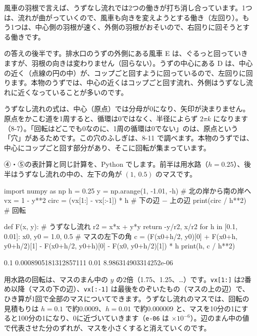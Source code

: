 \noindent 風車の羽根で言えば、うずなし流れでは2つの働きが打ち消し合っています。1つは、流れが曲がっていくので、風車も向きを変えようとする働き（左回り）。もう1つは、中心側の羽根が速く、外側の羽根がおそいので、右回りに回そうとする働きです。

\noindent \bkhatenaref の答えの後半です。排水口のうずの外側にある風車 E は、ぐるっと回っていきますが、羽根の向きは変わりません（回らない）。うずの中心にある D は、中心の近く（点線の円の中）が、コップごと回すように回っているので、左回りに回ります。本物のうずでは、中心の近くはコップごと回す流れ、外側はうずなし流れに近くなっていることが多いのです。

\begin{seikaku}
うずなし流れの式は、中心（原点）では分母が0になり、矢印が決まりません。原点をかこむ道を1周すると、循環は0ではなく、半径によらず $2\pi k$ になります（8-7）。「回転はどこでも0なのに、1周の循環は0でない」のは、原点という「穴」があるためです。この穴のふしぎは、8-11 で調べます。本物のうずでは、中心にコップごと回す部分があり、そこに回転が集まっています。
\end{seikaku}

④・⑤の表計算と同じ計算を、Python でします。前半は用水路（$h=0.25$）、後半はうずなし流れの中の、左下の角が $(1,\ 0.5)$ のマスです。
\begin{bkcode}[Python]
import numpy as np
h = 0.25
y = np.arange(1, -1.01, -h)      \# 北の岸から南の岸へ
vx = 1 - y**2
circ = (vx[1:] - vx[:-1]) * h    \# 下の辺 − 上の辺
print(circ / h**2)               \# 回転

def F(x, y):                     \# うずなし流れ
    r2 = x*x + y*y
    return -y/r2, x/r2
for h in [0.1, 0.01]:
    x0, y0 = 1.0, 0.5            \# マスの左下の角
    c = (F(x0+h/2, y0)[0] + F(x0+h, y0+h/2)[1]
         - F(x0+h/2, y0+h)[0] - F(x0, y0+h/2)[1]) * h
    print(h, c / h**2)
\end{bkcode}
\begin{bkcodeout}[実行結果]
[ 1.75  1.25  0.75  0.25 -0.25 -0.75 -1.25 -1.75]
0.1 0.0008905181312857111
0.01 8.986314903314252e-06
\end{bkcodeout}
用水路の回転は、マスのまん中の $y$ の2倍（1.75、1.25、…）です。\texttt{vx[1:]} は2番め以降（マスの下の辺）、\texttt{vx[:-1]} は最後をのぞいたもの（マスの上の辺）で、ひき算が1回で全部のマスについてできます。うずなし流れのマスでは、回転の見積もりは $h=0.1$ で約0.0009、$h=0.01$ で約0.000009 と、マスを10分の1にすると100分の1になり、0に近づいていきます（\texttt{e-06} は $\times10^{-6}$）。辺のまん中の値で代表させた分のずれが、マスを小さくすると消えていくのです。


